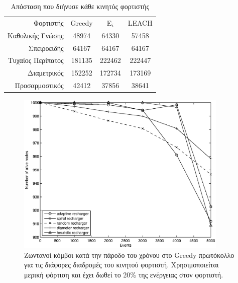 \begin{table}[H]
\begin{tabular}{r|c|c|c|}
Φορτιστής & Greedy & E$_i$ & LEACH\\\cline{1-4}\cline{1-4}
Καθολικής Γνώσης & 48974 & 64330 & 57458\\\cline{1-4}
Σπειροειδής & 64167 & 64167 & 64167\\\cline{1-4}
Τυχαίος Περίπατος & 181135 & 222462 & 222447 \\\cline{1-4}
Διαμετρικός & 152252 & 172734 & 173169\\\cline{1-4}
Προσαρμοστικός & 42412 & 37856 & 38641\\\cline{1-4}
\end{tabular}
\caption{Απόσταση που διήνυσε κάθε κινητός φορτιστής}
\label{tab:dist}
\end{table}

\begin{figure}[H]
  \centering
  \includegraphics[width=0.9\textwidth]{experiments/classic/4.ourVSnaive/alive_nodes_greedy_rc_per_our-spiral-random-diameter-heuristic.eps}
  \caption{Ζωντανοί κόμβοι κατά την πάροδο του χρόνου στο Greedy πρωτόκολλο για τις διάφορες διαδρομές του κινητού φορτιστή. Χρησιμοποιείται μερική φόρτιση και έχει
δωθεί το 20\% της ενέργειας στον φορτιστή.}
  \label{fig:4exp_1_1}
\end{figure}

